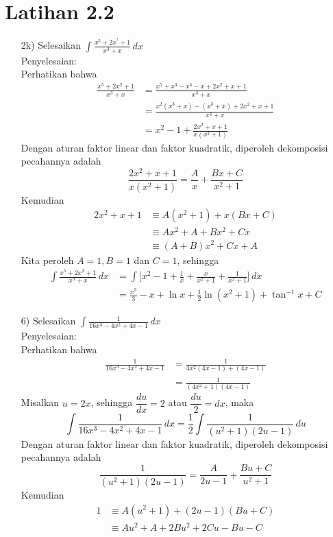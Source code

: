 \documentclass{article}
\begin{document}
\section*{Latihan 2.2}
\begin{enumerate}
	\item[2k)] Selesaikan \(\displaystyle \int \frac{x^5+2x^^2+1}{x^3+x} \, dx\) \\
	Penyelesaian: \\
	Perhatikan bahwa
	\begin{align*}
	\frac{x^5+2x^2+1}{x^3+x} &= \frac{x^5+x^3-x^3-x+2x^2+x+1}{x^3+x} \\
	&= \frac{x^2(x^3+x)-(x^3+x)+2x^2+x+1}{x^3+x} \\
	&= x^2-1 + \frac{2x^2+x+1}{x(x^2+1)}
	\end{align*} 
	Dengan aturan faktor linear dan faktor kuadratik, diperoleh dekomposisi pecahannya adalah \[ \frac{2x^2+x+1}{x(x^2+1)} = \frac{A}{x} + \frac{Bx+C}{x^2+1} \]
	Kemudian 
	\begin{align*}
	2x^2+x+1 &\equiv A(x^2+1)+x(Bx+C) \\
	&\equiv Ax^2+A+Bx^2+Cx \\
	&\equiv (A+B)x^2+Cx+A
	\end{align*}
	Kita peroleh $A=1, B=1$ dan $C=1$, sehingga
	\begin{align*}
	\int \frac{x^5+2x^2+1}{x^3+x} \, dx &= \int \bigg[x^2-1+\frac{1}{x} + \frac{x}{x^2+1} + \frac{1}{x^2+1}\bigg] \, dx \\
	&= \frac{x^3}{3}-x+\ln x + \frac{1}{2}\ln(x^2+1) + \tan^{-1}x + C
	\end{align*}
	\item[6)] Selesaikan \(\displaystyle \int \frac{1}{16x^3-4x^2+4x-1} \, dx\) \\
	Penyelesaian: \\
	Perhatikan bahwa 
	\begin{align*}
	\frac{1}{16x^3-4x^2+4x-1} &= \frac{1}{4x^2(4x-1)+(4x-1)} \\
	&= \frac{1}{(4x^2+1)(4x-1)}
	\end{align*}
	Misalkan $u=2x$, sehingga $\dfrac{du}{dx}=2$ atau $\dfrac{du}{2}=dx$, maka \[\int \frac{1}{16x^3-4x^2+4x-1} \, dx = \frac{1}{2} \int \frac{1}{(u^2+1)(2u-1)} \, du\]	Dengan aturan faktor linear dan faktor kuadratik, diperoleh dekomposisi pecahannya adalah \[ \frac{1}{(u^2+1)(2u-1)} = \frac{A}{2u-1} + \frac{Bu+C}{u^2+1}\]
	Kemudian 
	\begin{align*}
	1 &\equiv A(u^2+1)+(2u-1)(Bu+C) \\
	&\equiv Au^2+A+2Bu^2+2Cu-Bu-C \\

\end{align*}
\end{enumerate}
\end{document}
